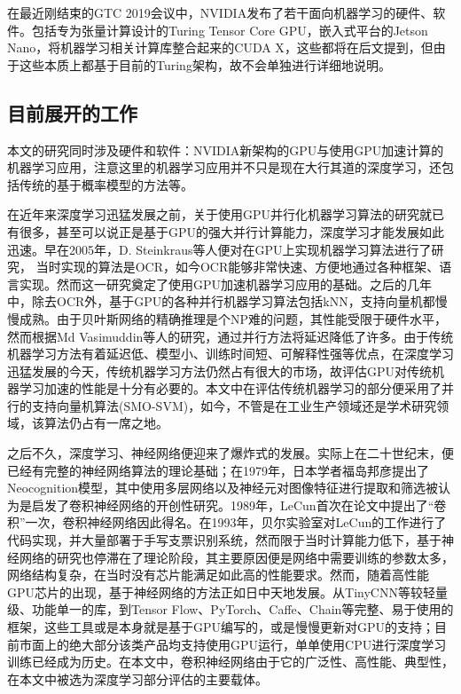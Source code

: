 \par 在最近刚结束的GTC 2019会议中，NVIDIA发布了若干面向机器学习的硬件、软件。包括专为张量计算设计的Turing Tensor Core GPU，嵌入式平台的Jetson Nano\cite{JETSONNANO}，将机器学习相关计算库整合起来的CUDA X\cite{CUDAX}，这些都将在后文提到，但由于这些本质上都基于目前的Turing架构，故不会单独进行详细地说明。
\subsection{目前展开的工作}
\par 本文的研究同时涉及硬件和软件：NVIDIA新架构的GPU与使用GPU加速计算的机器学习应用，注意这里的机器学习应用并不只是现在大行其道的深度学习，还包括传统的基于概率模型的方法等。
\par 在近年来深度学习迅猛发展之前，关于使用GPU并行化机器学习算法的研究就已有很多，甚至可以说正是基于GPU的强大并行计算能力，深度学习才能发展如此迅速。早在2005年，D. Steinkraus等人便对在GPU上实现机器学习算法进行了研究， 当时实现的算法是OCR，如今OCR能够非常快速、方便地通过各种框架、语言实现。然而这一研究奠定了使用GPU加速机器学习应用的基础\cite{GPUFORML}。之后的几年中，除去OCR外，基于GPU的各种并行机器学习算法包括kNN\cite{KNNG}，支持向量机\cite{SMOSVM}都慢慢成熟。由于贝叶斯网络的精确推理是个NP难的问题，其性能受限于硬件水平，然而根据Md Vasimuddin等人的研究\cite{BAYESINF}，通过并行方法将延迟降低了许多。由于传统机器学习方法有着延迟低、模型小、训练时间短、可解释性强等优点，在深度学习迅猛发展的今天，传统机器学习方法仍然占有很大的市场，故评估GPU对传统机器学习加速的性能是十分有必要的。本文中在评估传统机器学习的部分便采用了并行的支持向量机算法(SMO-SVM)，如今，不管是在工业生产领域还是学术研究领域，该算法仍占有一席之地。
\par 之后不久，深度学习、神经网络便迎来了爆炸式的发展。实际上在二十世纪末，便已经有完整的神经网络算法的理论基础；在1979年，日本学者福岛邦彦提出了Neocognition模型，其中使用多层网络以及神经元对图像特征进行提取和筛选被认为是启发了卷积神经网络的开创性研究\cite{JAPANESSAY}。1989年，LeCun首次在论文中提出了“卷积”一次，卷积神经网络因此得名\cite{LENET}。在1993年，贝尔实验室对LeCun的工作进行了代码实现，并大量部署于手写支票识别系统，然而限于当时计算能力低下，基于神经网络的研究也停滞在了理论阶段，其主要原因便是网络中需要训练的参数太多，网络结构复杂，在当时没有芯片能满足如此高的性能要求\cite{NNML}。然而，随着高性能GPU芯片的出现，基于神经网络的方法正如日中天地发展。从TinyCNN等较轻量级、功能单一的库，到Tensor Flow、PyTorch、Caffe、Chain等完整、易于使用的框架，这些工具或是本身就是基于GPU编写的，或是慢慢更新对GPU的支持；目前市面上的绝大部分该类产品均支持使用GPU运行，单单使用CPU进行深度学习训练已经成为历史。在本文中，卷积神经网络由于它的广泛性、高性能、典型性，在本文中被选为深度学习部分评估的主要载体。
